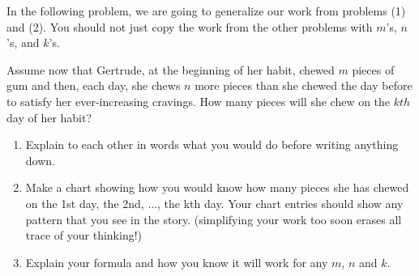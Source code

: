 \documentclass[noauthor,nooutcomes,handout]{ximera}
\begin{document}
In the following problem, we are going to generalize our work from problems (1) and (2).  You should not just copy the work from the other problems with $m$'s, $n$'s, and $k$'s.
\begin{problem}

Assume now that Gertrude, at the beginning of her habit, chewed $m$
pieces of gum and then, each day, she chews $n$ more pieces than she
chewed the day before to satisfy her ever-increasing cravings.  How many pieces will she chew on the $kth$
  day of her habit? 
\begin{enumerate}
    \item Explain to each other in words what you would do before writing anything down.
    \item Make a chart showing how you would know how many pieces she has chewed on the 1st day, the 2nd, ..., the kth day.  Your chart entries should show any pattern that you see in the story.  (simplifying  your work too soon erases all trace of your thinking!)
    \item  Explain your formula and how you know it will work for any $m$, $n$ and $k$.  
\end{enumerate}  
 
\end{problem}


\pagebreak
\end{document}

